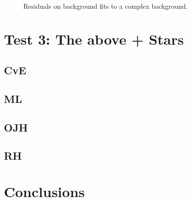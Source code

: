 \documentclass[10pt, a4paper]{article}
\begin{document}
\begin{figure}[!ht]
   \centering
   \quad
   \\
   \quad
   \caption{Residuals on background fits to a complex background.}
\end{figure}

\section{Test 3: The above + Stars}
\subsection{CvE}
\subsection{ML}
\subsection{OJH}
\subsection{RH}


\section{Conclusions}
\end{document}
